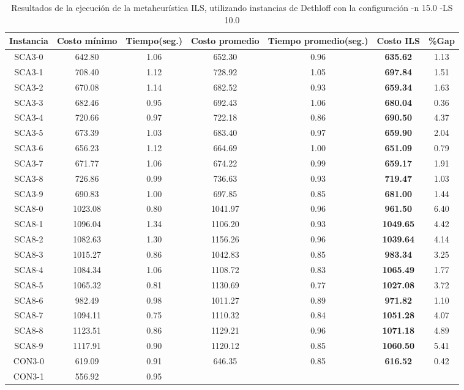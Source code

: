 \begin{table}[ht]
\caption{Resultados de la ejecución de la metaheurística ILS, utilizando instancias de Dethloff con la configuración -n 15.0 -LS 10.0}
\centering
\small
\begin{tabular}{c c c c c c c}
\hline\hline
Instancia & Costo mínimo & Tiempo(seg.) & Costo promedio & Tiempo promedio(seg.) & Costo ILS & \%Gap \\ [0.5ex]
\hline
SCA3-0 & 642.80 & 1.06 & 
652.30 & 0.96 & \bf{635.62} & 
1.13\\SCA3-1 & 708.40 & 1.12 & 
728.92 & 1.05 & \bf{697.84} & 
1.51\\SCA3-2 & 670.08 & 1.14 & 
682.52 & 0.93 & \bf{659.34} & 
1.63\\SCA3-3 & 682.46 & 0.95 & 
692.43 & 1.06 & \bf{680.04} & 
0.36\\SCA3-4 & 720.66 & 0.97 & 
722.18 & 0.86 & \bf{690.50} & 
4.37\\SCA3-5 & 673.39 & 1.03 & 
683.40 & 0.97 & \bf{659.90} & 
2.04\\SCA3-6 & 656.23 & 1.12 & 
664.69 & 1.00 & \bf{651.09} & 
0.79\\SCA3-7 & 671.77 & 1.06 & 
674.22 & 0.99 & \bf{659.17} & 
1.91\\SCA3-8 & 726.86 & 0.99 & 
736.63 & 0.93 & \bf{719.47} & 
1.03\\SCA3-9 & 690.83 & 1.00 & 
697.85 & 0.85 & \bf{681.00} & 
1.44\\SCA8-0 & 1023.08 & 0.80 & 
1041.97 & 0.96 & \bf{961.50} & 
6.40\\SCA8-1 & 1096.04 & 1.34 & 
1106.20 & 0.93 & \bf{1049.65} & 
4.42\\SCA8-2 & 1082.63 & 1.30 & 
1156.26 & 0.96 & \bf{1039.64} & 
4.14\\SCA8-3 & 1015.27 & 0.86 & 
1042.83 & 0.85 & \bf{983.34} & 
3.25\\SCA8-4 & 1084.34 & 1.06 & 
1108.72 & 0.83 & \bf{1065.49} & 
1.77\\SCA8-5 & 1065.32 & 0.81 & 
1130.69 & 0.77 & \bf{1027.08} & 
3.72\\SCA8-6 & 982.49 & 0.98 & 
1011.27 & 0.89 & \bf{971.82} & 
1.10\\SCA8-7 & 1094.11 & 0.75 & 
1110.32 & 0.84 & \bf{1051.28} & 
4.07\\SCA8-8 & 1123.51 & 0.86 & 
1129.21 & 0.96 & \bf{1071.18} & 
4.89\\SCA8-9 & 1117.91 & 0.90 & 
1120.12 & 0.85 & \bf{1060.50} & 
5.41\\CON3-0 & 619.09 & 0.91 & 
646.35 & 0.85 & \bf{616.52} & 
0.42\\CON3-1 & 556.92 & 0.95 & 

\end{tabular}
\end{table}
